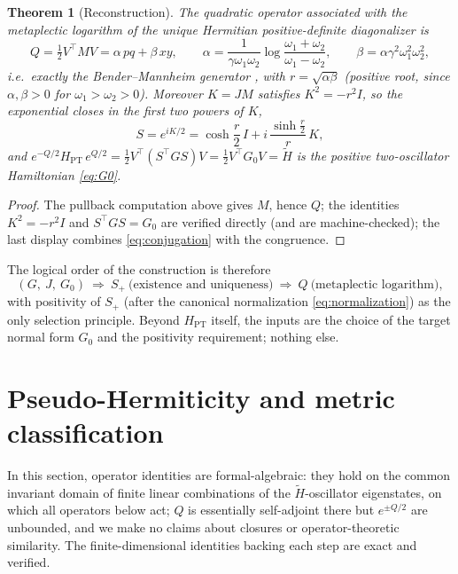 \documentclass[11pt]{article}
\newtheorem{theorem}{Theorem}[section]
\theoremstyle{definition}
\theoremstyle{remark}
\newcommand{\w}{\omega}
\begin{document}
\begin{theorem}[Reconstruction]\label{thm:reconstruction}
The quadratic operator associated with the metaplectic logarithm of the
unique Hermitian positive-definite diagonalizer is
\begin{equation}
Q=\tfrac12V^{\top}MV=\alpha\,pq+\beta\,xy,
\qquad
\alpha=\frac{1}{\gamma\w_1\w_2}\log\frac{\w_1+\w_2}{\w_1-\w_2},
\qquad
\beta=\alpha\gamma^2\w_1^2\w_2^2 ,
\end{equation}
i.e.\ exactly the Bender--Mannheim generator \cite{BM2008PRD}, with
$r=\sqrt{\alpha\beta}$ (positive root, since $\alpha,\beta>0$ for
$\w_1>\w_2>0$).  Moreover $K=JM$ satisfies $K^2=-r^2I$, so the exponential
closes in the first two powers of $K$,
\begin{equation}
S=e^{iK/2}=\cosh\frac r2\,I+i\,\frac{\sinh\frac r2}{r}\,K ,
\end{equation}
and $e^{-Q/2}H_{\mathrm{PT}}\,e^{Q/2}
=\tfrac12V^{\top}(S^{\top}GS)V=\tfrac12V^{\top}G_0V=\widetilde H$
is the positive two-oscillator Hamiltonian \eqref{eq:G0}.
\end{theorem}

\begin{proof}
The pullback computation above gives $M$, hence $Q$; the identities
$K^2=-r^2I$ and $S^{\top}GS=G_0$ are verified directly (and are
machine-checked); the last display combines \eqref{eq:conjugation} with the
congruence.
\end{proof}

The logical order of the construction is therefore
\begin{equation}
(G,\ J,\ G_0)\ \Longrightarrow\ S_+\ \text{(existence and uniqueness)}
\ \Longrightarrow\ Q\ \text{(metaplectic logarithm)} ,
\end{equation}
with positivity of $S_+$ (after the canonical normalization
\eqref{eq:normalization}) as the only selection principle.  Beyond
$H_{\mathrm{PT}}$ itself, the inputs are the choice of the target normal form
$G_0$ and the positivity requirement; nothing else.

\section{Pseudo-Hermiticity and metric classification}\label{sec:pseudo}

In this section, operator identities are formal-algebraic: they hold on the
common invariant domain of finite linear combinations of the
$\widetilde H$-oscillator eigenstates, on which all operators below act;
$Q$ is essentially self-adjoint there but $e^{\pm Q/2}$ are unbounded, and we
make no claims about closures or operator-theoretic similarity.  The
finite-dimensional identities backing each step are exact and verified.
\end{document}
